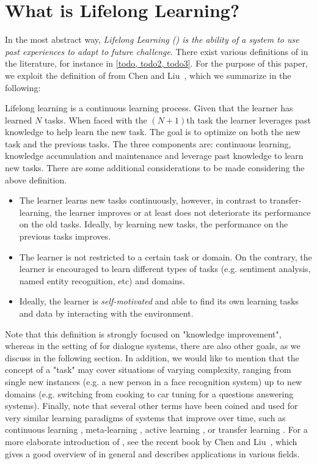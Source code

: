 \documentclass{lihlith}
\theoremstyle{definition}
\theoremstyle{remark}
\begin{document}


\section{What is Lifelong Learning?}
In the most abstract way, \emph{Lifelong Learning (\LLL) is the ability of a system to use past experiences to adapt to future challenge}. There exist various definitions of \LLL in the literature, for instance in \ref{todo, todo2, todo3}. For the purpose of this paper, we exploit the definition of \LLL from Chen and Liu~\cite{Chen:2016:LML:3086758}, which we summarize in the following: 

Lifelong learning is a continuous learning process. Given that the learner has learned $N$ tasks. When faced with the $(N+1)$th task the learner leverages past knowledge to help learn the new task. The goal is to optimize on both the new task and the previous tasks. The three components are: continuous learning, knowledge accumulation and maintenance and leverage past knowledge to learn new tasks. 
There are some additional considerations to be made considering the above definition. 
\begin{itemize}
\item The learner learns new tasks continuously, however, in contrast to transfer-learning, the learner improves or at least does not deteriorate its performance on the old tasks. Ideally, by learning new tasks, the performance on the previous tasks improves. 
\item The learner is not restricted to a certain task or domain. On the contrary, the learner is encouraged to learn different types of tasks (e.g. sentiment analysis, named entity recognition, etc) and domains. 
\item Ideally, the learner is \emph{self-motivated} and able to find its own learning tasks and data by interacting with the environment. 
\end{itemize}

Note that this definition is strongly focused on "knowledge improvement", whereas in the setting of \LLL for dialogue systems, there are also other goals, as we discuss in the following section. In addition, we would like to mention that the concept of a "task" may cover situations of varying complexity, ranging from single new instances (e.g. a new person in a face recognition system) up to new domains (e.g. switching from cooking to car tuning for a questions answering systems). Finally, note that several other terms have been coined and used for very similar learning paradigms of systems that improve over time, such as continuous learning \cite{goodfellow2013empirical,parisi2018continual}, meta-learning \cite{vilalta2002perspective}, active learning \cite{settles2012active}, or transfer learning \cite{Pan:2010:STL:1850483.1850545}. For a more elaborate introduction of \LLL, see the recent book by Chen and Liu~\cite{Chen:2016:LML:3086758}, which gives a good overview of \LLL in general and describes applications in various fields. 
\end{document}
